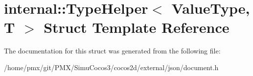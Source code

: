 \hypertarget{structinternal_1_1TypeHelper}{}\section{internal\+:\+:Type\+Helper$<$ Value\+Type, T $>$ Struct Template Reference}
\label{structinternal_1_1TypeHelper}


The documentation for this struct was generated from the following file\+:\begin{DoxyCompactItemize}
\item 
/home/pmx/git/\+P\+M\+X/\+Simu\+Cocos3/cocos2d/external/json/document.\+h\end{DoxyCompactItemize}
